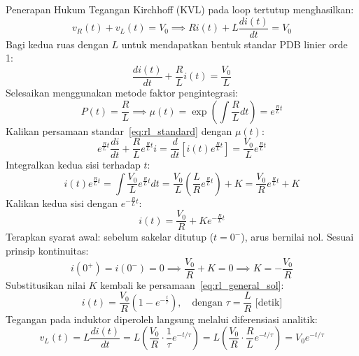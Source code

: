 \documentclass[11pt,a4paper]{article}
\theoremstyle{definition}
\begin{document}
Penerapan Hukum Tegangan Kirchhoff (KVL) pada loop tertutup menghasilkan:
\begin{equation}
    v_R(t) + v_L(t) = V_0 \implies R i(t) + L \frac{di(t)}{dt} = V_0
    \label{eq:rl_kvl}
\end{equation}
Bagi kedua ruas dengan $L$ untuk mendapatkan bentuk standar PDB linier orde 1:
\begin{equation}
    \frac{di(t)}{dt} + \frac{R}{L} i(t) = \frac{V_0}{L}
    \label{eq:rl_standard}
\end{equation}
Selesaikan menggunakan metode faktor pengintegrasi:
\begin{equation}
    P(t) = \frac{R}{L} \implies \mu(t) = \exp\left(\int \frac{R}{L} dt\right) = e^{\frac{R}{L} t}
\end{equation}
Kalikan persamaan standar~\eqref{eq:rl_standard} dengan $\mu(t)$:
\begin{equation}
    e^{\frac{R}{L} t} \frac{di}{dt} + \frac{R}{L} e^{\frac{R}{L} t} i = \frac{d}{dt}\left[ i(t) e^{\frac{R}{L} t} \right] = \frac{V_0}{L} e^{\frac{R}{L} t}
\end{equation}
Integralkan kedua sisi terhadap $t$:
\begin{equation}
    i(t) e^{\frac{R}{L} t} = \int \frac{V_0}{L} e^{\frac{R}{L} t} dt = \frac{V_0}{L} \left( \frac{L}{R} e^{\frac{R}{L} t} \right) + K = \frac{V_0}{R} e^{\frac{R}{L} t} + K
\end{equation}
Kalikan kedua sisi dengan $e^{-\frac{R}{L} t}$:
\begin{equation}
    i(t) = \frac{V_0}{R} + K e^{-\frac{R}{L} t}
    \label{eq:rl_general_sol}
\end{equation}
Terapkan syarat awal: sebelum sakelar ditutup ($t = 0^-$), arus bernilai nol. Sesuai prinsip kontinuitas:
\begin{equation}
    i(0^+) = i(0^-) = 0 \implies \frac{V_0}{R} + K = 0 \implies K = -\frac{V_0}{R}
\end{equation}
Substitusikan nilai $K$ kembali ke persamaan~\eqref{eq:rl_general_sol}:
\begin{equation}
    i(t) = \frac{V_0}{R} \left( 1 - e^{-\frac{t}{\tau}} \right), \quad \text{dengan } \tau = \frac{L}{R} \text{ [detik]}
    \label{eq:rl_step_solution}
\end{equation}
Tegangan pada induktor diperoleh langsung melalui diferensiasi analitik:
\begin{equation}
    v_L(t) = L \frac{di(t)}{dt} = L \left( \frac{V_0}{R} \cdot \frac{1}{\tau} e^{-t/\tau} \right) = L \left( \frac{V_0}{R} \cdot \frac{R}{L} e^{-t/\tau} \right) = V_0 e^{-t/\tau}
    \label{eq:vl_step_solution}
\end{equation}
\end{document}
